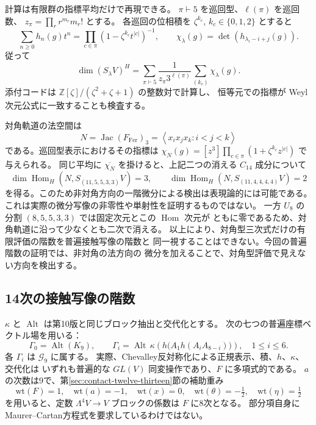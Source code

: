 計算は有限群の指標平均だけで再現できる。
\(\pi\vdash5\) を巡回型、\(\ell(\pi)\) を巡回数、
\(z_\pi=\prod_r r^{m_r}m_r!\) とする。
各巡回の位相積を \(\zeta^{k_c}\), \(k_c\in\{0,1,2\}\) とすると
\[
 \sum_{n\geq0}h_n(g)t^n
 =\prod_{c\in\pi}(1-\zeta^{k_c}t^{|c|})^{-1},\qquad
 \chi_\lambda(g)=\det(h_{\lambda_i-i+j}(g)).
\]
従って
\[
 \dim(S_\lambda V)^H
 =\sum_{\pi\vdash5}\frac{1}{z_\pi3^{\ell(\pi)}}
   \sum_{(k_c)}\chi_\lambda(g).
\]
添付コードは \(\mathbb Z[\zeta]/(\zeta^2+\zeta+1)\) の整数対で計算し、
恒等元での指標が Weyl 次元公式に一致することも検査する。

対角軌道の法空間は
\[
 N=\operatorname{Jac}(F_{\mathrm{Fer}})_3
 =\left\langle x_ix_jx_k:i<j<k\right\rangle
\]
である。巡回型表示におけるその指標は
\(\chi_N(g)=[z^3]\prod_{c\in\pi}(1+\zeta^{k_c}z^{|c|})\) で与えられる。
同じ平均に \(\overline{\chi_N}\) を掛けると、上記二つの消える
\(C_{14}\) 成分について
\[
 \dim\operatorname{Hom}_H(N,S_{(11,5,5,3,3)}V)=3,\qquad
 \dim\operatorname{Hom}_H(N,S_{(11,4,4,4,4)}V)=2
\]
を得る。このため非対角方向の一階微分による検出は表現論的には可能である。
これは実際の微分写像の非零性や単射性を証明するものではない。
一方 \(U_8\) の分割 \((8,5,5,3,3)\) では固定次元とこの \(\operatorname{Hom}\) 次元が
ともに零であるため、対角軌道に沿って少なくとも二次で消える。
以上により、対角型三次式だけの有限評価の階数を普遍接触写像の階数と
同一視することはできない。今回の普遍階数の証明では、非対角の法方向の
微分を加えることで、対角型評価で見えない方向を検出する。

\subsection{14次の接触写像の階数}
\label{subsec:v11-contact-rank-fourteenth}

$\kappa$ と $\operatorname{Alt}$ は第10版と同じブロック抽出と交代化とする。
次の七つの普遍座標ベクトル場を用いる：
\[
 \Gamma_0=\operatorname{Alt}(K_9),\qquad
 \Gamma_i=\operatorname{Alt}\,\kappa\!\left(
       h\bigl(A_1h(A_iA_{8-i})\bigr)\right),\quad 1\le i\le6.
\]
各 $\Gamma_i$ は $\mathcal G_9$ に属する。
実際、Chevalley反対称化による正規表示、積、$h$、$\kappa$、交代化は
いずれも普遍的な $GL(V)$ 同変操作であり、$F$ に多項式的である。
$a$ の次数は9で、第\ref{sec:contact-twelve-thirteen}節の補助重み
\[
 \mathrm{wt}(F)=1,\quad\mathrm{wt}(a)=-1,\quad
 \mathrm{wt}(x)=0,\quad\mathrm{wt}(\theta)=-\tfrac12,
 \quad\mathrm{wt}(\eta)=\tfrac12
\]
を用いると、定数 $\Lambda^4V\to V$ ブロックの係数は $F$ に8次となる。
部分項自身にMaurer--Cartan方程式を要求しているわけではない。

